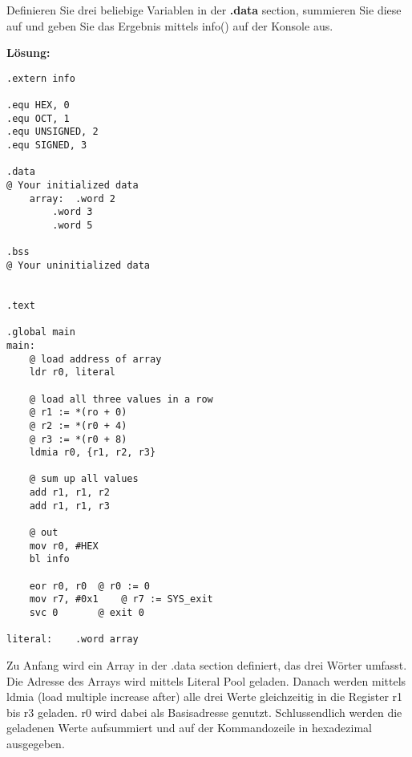 \documentclass[12pt]{article}
\begin{document}
Definieren Sie drei beliebige Variablen in der \textbf{.data} section, summieren Sie diese auf und geben Sie das Ergebnis mittels info()
auf der Konsole aus.

\textbf{Lösung:}
\begin{lstlisting}
.extern info

.equ HEX, 0
.equ OCT, 1
.equ UNSIGNED, 2
.equ SIGNED, 3

.data
@ Your initialized data
	array:	.word 2
		.word 3
		.word 5

.bss
@ Your uninitialized data


.text

.global main
main:
	@ load address of array
	ldr r0, literal
	
	@ load all three values in a row
	@ r1 := *(ro + 0)
	@ r2 := *(r0 + 4)
	@ r3 := *(r0 + 8)
	ldmia r0, {r1, r2, r3}

	@ sum up all values
	add r1, r1, r2
	add r1, r1, r3
	
	@ out
	mov r0, #HEX
	bl info

	eor r0, r0	@ r0 := 0
	mov r7, #0x1	@ r7 := SYS_exit
	svc 0		@ exit 0

literal:	.word array
\end{lstlisting}
Zu Anfang wird ein Array in der .data section definiert, das drei Wörter umfasst.
Die Adresse des Arrays wird mittels Literal Pool geladen.
Danach werden mittels ldmia (load multiple increase after) alle drei Werte gleichzeitig
in die Register r1 bis r3 geladen. r0 wird dabei als Basisadresse genutzt.
Schlussendlich werden die geladenen Werte aufsummiert und auf der Kommandozeile in 
hexadezimal ausgegeben.
\end{document}
